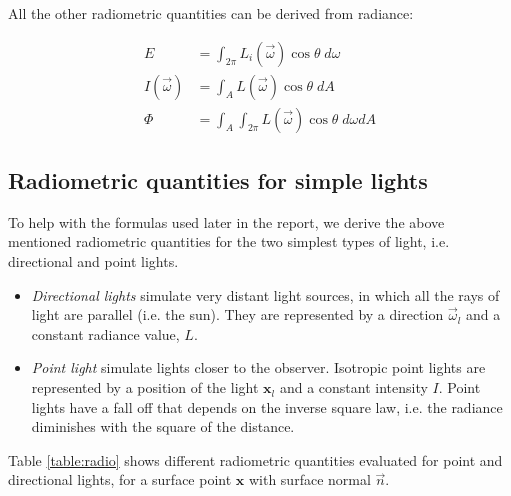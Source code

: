 All the other radiometric quantities can be derived from radiance:

\begin{equation*}
\begin{split}
E &= \int_{2\pi} L_i(\vec{\omega}) \cos\theta \; d\omega \\
I(\vec{\omega}) &= \int_A L(\vec{\omega}) \cos\theta \; dA \\
\Phi &= \int_A \int_{2\pi} L(\vec{\omega}) \cos\theta \; d\omega dA
\end{split}
\end{equation*}

\subsection{Radiometric quantities for simple lights}
To help with the formulas used later in the report, we derive the above mentioned radiometric quantities for the two simplest types of light, i.e. directional and point lights.
\begin{itemize}
	\item \textit{Directional lights} simulate very distant light sources, in which all the rays of light are parallel (i.e. the sun). They are represented by a direction $\vec{\omega}_l$ and a constant radiance value, $L$. 
	\item \textit{Point light} simulate lights closer to the observer. Isotropic point lights are represented by a position of the light $\mathbf{x}_l$ and a constant intensity $I$. Point lights have a fall off that depends on the inverse square law, i.e. the radiance diminishes with the square of the distance.
\end{itemize}

Table \ref{table:radio} shows different radiometric quantities evaluated for point and directional lights, for a surface point $\mathbf{x}$ with surface normal $\vec{n}$. 

